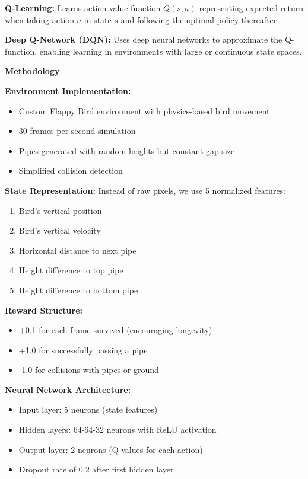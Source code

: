 \documentclass[a1paper,portrait]{article}
\newcommand{\postersection}[1]{
  \vspace{0.5cm}
  \noindent\textcolor{headerblue}{\Large\textbf{#1}}
  \vspace{0.3cm}
}
\begin{document}
\begin{multicols}{3}
\textbf{Q-Learning:} Learns action-value function $Q(s,a)$ representing expected return when taking action $a$ in state $s$ and following the optimal policy thereafter.

\textbf{Deep Q-Network (DQN):} Uses deep neural networks to approximate the Q-function, enabling learning in environments with large or continuous state spaces.

\postersection{Methodology}
\textbf{Environment Implementation:}
\begin{itemize}
    \item Custom Flappy Bird environment with physics-based bird movement
    \item 30 frames per second simulation
    \item Pipes generated with random heights but constant gap size
    \item Simplified collision detection
\end{itemize}

\textbf{State Representation:} Instead of raw pixels, we use 5 normalized features:
\begin{enumerate}
    \item Bird's vertical position
    \item Bird's vertical velocity
    \item Horizontal distance to next pipe
    \item Height difference to top pipe
    \item Height difference to bottom pipe
\end{enumerate}

\textbf{Reward Structure:}
\begin{itemize}
    \item +0.1 for each frame survived (encouraging longevity)
    \item +1.0 for successfully passing a pipe
    \item -1.0 for collisions with pipes or ground
\end{itemize}

\textbf{Neural Network Architecture:}
\begin{itemize}
    \item Input layer: 5 neurons (state features)
    \item Hidden layers: 64-64-32 neurons with ReLU activation
    \item Output layer: 2 neurons (Q-values for each action)
    \item Dropout rate of 0.2 after first hidden layer
\end{itemize}


\end{multicols}
\end{document}

